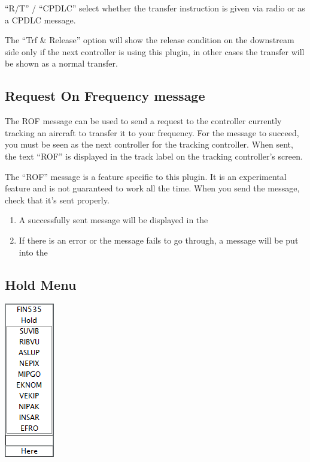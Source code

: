 \documentclass[11pt,a4paper]{memoir}
\newenvironment{Warn}
  {\begin{shaded}\marginnote{\fbox{Warning}}}
  {\end{shaded}}
\begin{document}
“R/T” / “CPDLC” select whether the transfer instruction is given via radio or as a CPDLC message.

\begin{Warn}
The “Trf \& Release” option will show the release condition on the downstream side only if the next controller is using this plugin, in other cases the transfer will be shown as a normal transfer.
\end{Warn}

\subsection{Request On Frequency message}
\label{menu:rof}

The ROF message can be used to send a request to the controller currently tracking an aircraft to transfer it to your frequency. For the message to succeed, you must be seen as the next controller for the tracking controller. When sent, the text “ROF” is displayed in the track label on the tracking controller’s screen.

\begin{Warn}
The “ROF” message is a feature specific to this plugin. It is an experimental feature and is not guaranteed to work all the time. When you send the message, check that it’s sent properly.
\begin{enumerate}
        \item A successfully sent message will be displayed in the \textit{}
        \item If there is an error or the message fails to go through, a message will be put into the \textit{}
\end{enumerate}
\end{Warn}

\subsection{Hold Menu}
\label{menu:hold}

\includegraphics{img/hold.png}
\end{document}
